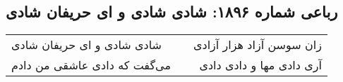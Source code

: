 \begin{center}
\section*{رباعی شماره ۱۸۹۶: شادی شادی و ای حریفان شادی}
\label{sec:1896}
\begin{longtable}{l p{0.5cm} r}
شادی شادی و ای حریفان شادی
&&
زان سوسن آزاد هزار آزادی
\\
می‌گفت که دادی عاشقی من دادم
&&
آری دادی مها و دادی دادی
\\
\end{longtable}
\end{center}
